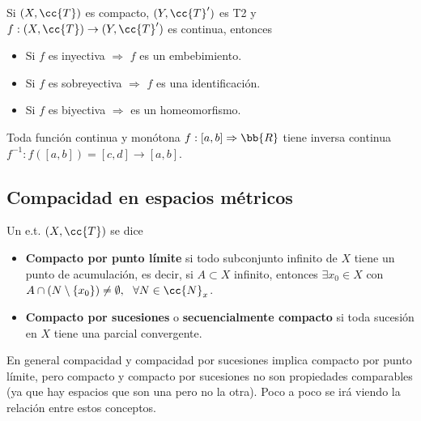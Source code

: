 \begin{coro}
    Si $(X, \cc{T})$ es compacto, $(Y, \cc{T}')$ es T2 y $f:(X, \cc{T})\to (Y, \cc{T}')$ es continua, entonces 
    \begin{itemize}
        \item Si $f$ es inyectiva $\Rightarrow$ $f$ es un embebimiento.
        \item Si $f$ es sobreyectiva $\Rightarrow$ $f$ es una identificación.
        \item Si $f$ es biyectiva $\Rightarrow$ es un homeomorfismo.
    \end{itemize}
    \endsquare
\end{coro}

\begin{ejemplo}
    Toda función continua y monótona $f:[a,b]\Rightarrow \bb{R}$ tiene inversa continua $f^{-1}:f([a,b])=[c,d] \to [a,b]$.
    \endsquare
\end{ejemplo}

\subsection{Compacidad en espacios métricos}

\begin{definicion}
    Un e.t. $(X, \cc{T})$ se dice
    \begin{itemize}
        \item \textbf{Compacto por punto límite} si todo subconjunto infinito de $X$ tiene un punto de acumulación, es decir, si $A\subset X$ infinito, entonces $\exists x_0\in X$ con $A\cap(N\setminus\{x_0\})\neq \emptyset,\ \ \forall N\in \cc{N}_x$.
        \item \textbf{Compacto por sucesiones} o \textbf{secuencialmente compacto} si toda sucesión en $X$ tiene una parcial convergente. 
    \end{itemize}
    \endsquare
\end{definicion}

En general compacidad y compacidad por sucesiones implica compacto por punto límite, pero compacto y compacto por sucesiones no son propiedades comparables (ya que hay espacios que son una pero no la otra). Poco a poco se irá viendo la relación entre estos conceptos.

